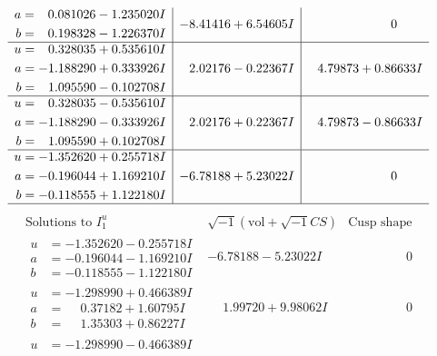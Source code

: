 \documentclass[1p]{elsarticle_modified}
\theoremstyle{definition}
\newcommand{\I}{\sqrt{-1}}
\begin{document}
$$\begin{array}{c|c|c}
\begin{aligned}
a &= \phantom{-}0.081026 - 1.235020 I \\
b &= \phantom{-}0.198328 - 1.226370 I\end{aligned}
 & -8.41416 + 6.54605 I & \phantom{-0.000000 } 0 \\ \hline\begin{aligned}
u &= \phantom{-}0.328035 + 0.535610 I \\
a &= -1.188290 + 0.333926 I \\
b &= \phantom{-}1.095590 - 0.102708 I\end{aligned}
 & \phantom{-}2.02176 - 0.22367 I & \phantom{-}4.79873 + 0.86633 I \\ \hline\begin{aligned}
u &= \phantom{-}0.328035 - 0.535610 I \\
a &= -1.188290 - 0.333926 I \\
b &= \phantom{-}1.095590 + 0.102708 I\end{aligned}
 & \phantom{-}2.02176 + 0.22367 I & \phantom{-}4.79873 - 0.86633 I \\ \hline\begin{aligned}
u &= -1.352620 + 0.255718 I \\
a &= -0.196044 + 1.169210 I \\
b &= -0.118555 + 1.122180 I\end{aligned}
 & -6.78188 + 5.23022 I & \phantom{-0.000000 } 0\\
 \hline 
 \end{array}$$\newpage$$\begin{array}{c|c|c}  
\text{Solutions to }I^u_{1}& \I (\text{vol} + \sqrt{-1}CS) & \text{Cusp shape}\\
 \hline 
\begin{aligned}
u &= -1.352620 - 0.255718 I \\
a &= -0.196044 - 1.169210 I \\
b &= -0.118555 - 1.122180 I\end{aligned}
 & -6.78188 - 5.23022 I & \phantom{-0.000000 } 0 \\ \hline\begin{aligned}
u &= -1.298990 + 0.466389 I \\
a &= \phantom{-}0.37182 + 1.60795 I \\
b &= \phantom{-}1.35303 + 0.86227 I\end{aligned}
 & \phantom{-}1.99720 + 9.98062 I & \phantom{-0.000000 } 0 \\ \hline\begin{aligned}
u &= -1.298990 - 0.466389 I \\

\end{aligned}
\end{array}$$
\end{document}
